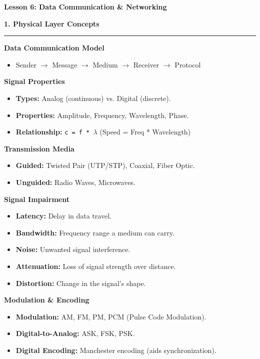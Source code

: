 \documentclass[a4paper, 8pt]{extarticle}
\newcommand{\sectionheading}[1]{\large\textbf{#1}\par\noindent\rule{\linewidth}{0.4pt}}
\newcommand{\subsectionheading}[1]{\normalsize\textbf{#1}}
\begin{document}
\pagestyle{empty} %

\begin{center}
    \fontsize{12pt}{14pt}\selectfont
    \textbf{Lesson 6: Data Communication \& Networking}
\end{center}
\vspace{1em}

\begin{multicols}{2}


\sectionheading{1. Physical Layer Concepts}
\vspace{0.5em}
\subsectionheading{Data Communication Model}
\begin{itemize}
    \item Sender $\rightarrow$ Message $\rightarrow$ Medium $\rightarrow$ Receiver $\rightarrow$ Protocol
\end{itemize}
\subsectionheading{Signal Properties}
\begin{itemize}
    \item \textbf{Types:} Analog (continuous) vs. Digital (discrete).
    \item \textbf{Properties:} Amplitude, Frequency, Wavelength, Phase.
    \item \textbf{Relationship:} \texttt{c = f * $\lambda$} (Speed = Freq * Wavelength)
\end{itemize}
\subsectionheading{Transmission Media}
\begin{itemize}
    \item \textbf{Guided:} Twisted Pair (UTP/STP), Coaxial, Fiber Optic.
    \item \textbf{Unguided:} Radio Waves, Microwaves.
\end{itemize}
\subsectionheading{Signal Impairment}
\begin{itemize}
    \item \textbf{Latency:} Delay in data travel.
    \item \textbf{Bandwidth:} Frequency range a medium can carry.
    \item \textbf{Noise:} Unwanted signal interference.
    \item \textbf{Attenuation:} Loss of signal strength over distance.
    \item \textbf{Distortion:} Change in the signal's shape.
\end{itemize}
\subsectionheading{Modulation \& Encoding}
\begin{itemize}
    \item \textbf{Modulation:} AM, FM, PM, PCM (Pulse Code Modulation).
    \item \textbf{Digital-to-Analog:} ASK, FSK, PSK.
    \item \textbf{Digital Encoding:} Manchester encoding (aids synchronization).
\end{itemize}


\end{multicols}
\end{document}
